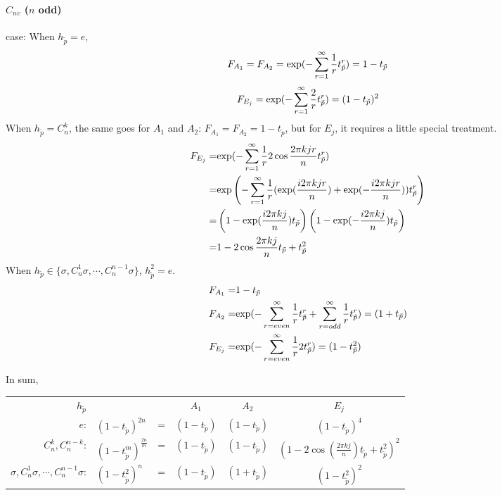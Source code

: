 \paragraph{$C_{nv}$ ($n$ odd)} case:
When $h_{\tilde p}=e$,
\[
  F_{A_1}=F_{A_2}={\rm exp} (-\sum_{r=1}^\infty {1 \over r}t_{\tilde{p}}^{r} )
  =1-t_{\tilde p}
\]
\[
  F_{E_j}={\rm exp} (-\sum_{r=1}^\infty {2 \over r}t_{\tilde{p}}^{r} )
  =(1-t_{\tilde p})^2
\]
When $h_{\tilde p}=C_n^k$, the same goes for $A_1$ and $A_2$:
$F_{A_1}=F_{A_2}=1-t_{\tilde p}$, but for $E_j$, it requires a little
special treatment.
\begin{align*}
  F_{E_j}= & {\rm exp} (-\sum_{r=1}^\infty {1 \over r}2\cos\frac{2\pi kjr}{n}
             t_{\tilde{p}}^{r} ) \\
  = & {\rm exp} \left(-\sum_{r=1}^\infty {1 \over r}(\exp(\frac{i2\pi
      kjr}{n})+\exp(-\frac{i2\pi kjr}{n}))t_{\tilde{p}}^{r} \right) \\
  = & \left(1-\exp(\frac{i2\pi kj}{n})t_{\tilde p} \right)
      \left(1-\exp(-\frac{i2\pi kj}{n})t_{\tilde p} \right) \\
  = & 1-2\cos\frac{2\pi kj}{n}t_{\tilde p}+t_{\tilde p}^2
\end{align*}
When $h_{\tilde p}\in \{\sigma,C_n^1\sigma,\cdots,C_n^{n-1}\sigma\}$,
$h_{\tilde p}^2=e$.
\begin{align*}
  F_{A_1}= &1-t_{\tilde p} \\
  F_{A_2}= &{\rm exp} (-\sum_{r=even}^\infty {1 \over r}t_{\tilde{p}}^{r}
             +\sum_{r=odd}^\infty {1 \over r}t_{\tilde{p}}^{r} )
             =(1+t_{\tilde p}) \\
  F_{E_j}= &{\rm exp} (-\sum_{r=even}^\infty {1 \over r}2t_{\tilde{p}}^{r})
             =(1-t_{\tilde p}^2)
\end{align*}

In sum,

\vskip 12pt
\begin{tabular}{rlcccc}

  $h_{\tilde p}$ &  & &  $A_1$  &  $A_2$  &  $E_j$  \\
  $e$:
                 & $(1-t_{\tilde p} )^{2n}$  &=&$(1-t_{\tilde p})$ & $(1-t_{\tilde p})$ &
                                                                                          $ (1-t_{\tilde p})^4 $ \\
  $C_n^k,C_n^{n-k} $:
                 & $(1-t_{\tilde p}^m )^{\frac{2n}{m}}$ &=&  $(1-t_{\tilde p})$ & $(1-t_{\tilde p})$ &
                                                                                                       $ (1-2\cos(\frac{2\pi kj}{n})t_{\tilde p}+t^{2}_{\tilde p})^2 $ \\
  $\sigma,C_n^1\sigma,\cdots,C_n^{n-1}\sigma$:
                 & $(1-t_{\tilde p}^2 )^{n}$ &=&  $(1-t_{\tilde p})$ &                      $(1+t_{\tilde p})$ &$ (1-t_{\tilde p}^2)^2 $ \\
\end{tabular}
\vskip 12pt
\noindent


